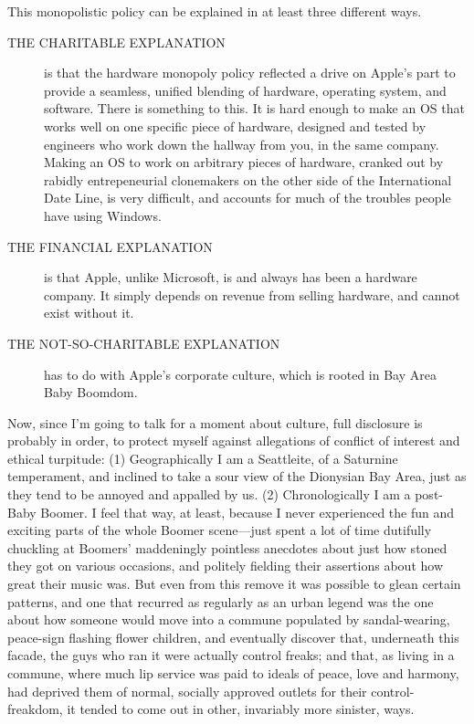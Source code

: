 \documentclass[
  fontsize=11pt,
  paper=landscape,
  twocolumn=true,
  pagesize=pdftex,
  headings=small,
  DIV=15,
  ]{scrartcl}
\begin{document}
This monopolistic policy can be explained in at least three different
ways.

\begin{description}
\item[THE CHARITABLE EXPLANATION]
is that the hardware monopoly policy reflected a drive on Apple's part
to provide a seamless, unified blending of hardware, operating system,
and software. There is something to this. It is hard enough to make an
OS that works well on one specific piece of hardware, designed and
tested by engineers who work down the hallway from you, in the same
company. Making an OS to work on arbitrary pieces of hardware, cranked
out by rabidly entrepeneurial clonemakers on the other side of the
International Date Line, is very difficult, and accounts for much of the
troubles people have using Windows.

\item[THE FINANCIAL EXPLANATION]
is that Apple, unlike Microsoft, is and always has been a hardware
company. It simply depends on revenue from selling hardware, and cannot
exist without it.

\item[THE NOT-SO-CHARITABLE EXPLANATION]
has to do with Apple's corporate culture, which is rooted in Bay Area
Baby Boomdom.

\end{description}
Now, since I'm going to talk for a moment about culture, full disclosure
is probably in order, to protect myself against allegations of conflict
of interest and ethical turpitude: (1) Geographically I am a Seattleite,
of a Saturnine temperament, and inclined to take a sour view of the
Dionysian Bay Area, just as they tend to be annoyed and appalled by us.
(2) Chronologically I am a post-Baby Boomer. I feel that way, at least,
because I never experienced the fun and exciting parts of the whole
Boomer scene---just spent a lot of time dutifully chuckling at Boomers'
maddeningly pointless anecdotes about just how stoned they got on
various occasions, and politely fielding their assertions about how
great their music was. But even from this remove it was possible to
glean certain patterns, and one that recurred as regularly as an urban
legend was the one about how someone would move into a commune populated
by sandal-wearing, peace-sign flashing flower children, and eventually
discover that, underneath this facade, the guys who ran it were actually
control freaks; and that, as living in a commune, where much lip service
was paid to ideals of peace, love and harmony, had deprived them of
normal, socially approved outlets for their control-freakdom, it tended
to come out in other, invariably more sinister, ways.
\end{document}
